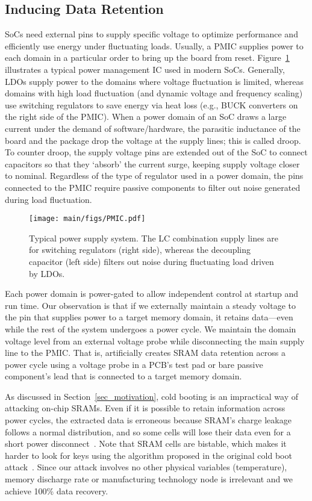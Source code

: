 \subsection{Inducing Data Retention}
\label{sec_attack_enabler}

SoCs need external pins to supply specific voltage to optimize performance and efficiently use energy under fluctuating loads.
Usually, a PMIC supplies power to each domain in a particular order to bring up the board from reset. 
Figure~\ref{fig:pmic} illustrates a typical power management IC used in modern SoCs. 
Generally, LDOs supply power to the domains where voltage fluctuation is limited, whereas domains with high load fluctuation (and dynamic voltage and frequency scaling) use switching regulators to save energy via heat loss (e.g., BUCK converters on the right side of the PMIC). 
When a power domain of an SoC draws a large current under the demand of software/hardware, the parasitic inductance of the board and the package drop the voltage at the supply lines;
this is called droop.
To counter droop, the supply voltage pins are extended out of the SoC to connect capacitors so that they `absorb' the current surge, keeping supply voltage closer to nominal. 
Regardless of the type of regulator used in a power domain, the pins connected to the PMIC require passive components to filter out noise generated during load fluctuation.

\begin{figure}
    \centering
    \texttt{[image: main/figs/PMIC.pdf]}
    \caption{Typical power supply system.  The LC combination supply lines are for switching regulators (right side), whereas the decoupling capacitor (left side) filters out noise during fluctuating load driven by LDOs.}
    \label{fig:pmic}
\end{figure}

Each power domain is power-gated to allow independent control at startup and run time. 
Our observation is that if we externally maintain a steady voltage to the pin that supplies power to a target memory domain, it retains data---even while the rest of the system undergoes a power cycle.  
We maintain the domain voltage level from an external voltage probe while disconnecting the main supply line to the PMIC. 
That is, \sys{} artificially creates SRAM data retention across a power cycle using a voltage probe in a PCB's test pad or bare passive component's lead that is connected to a target memory domain. 

As discussed in Section~\ref{sec_motivation}, cold booting is an impractical way of attacking on-chip SRAMs.   
Even if it is possible to retain information across power cycles, the extracted data is erroneous because SRAM's charge leakage follows a normal distribution, and so some cells will lose their data even for a short power disconnect~\cite{qin2004sram}. Note that SRAM cells are bistable, which makes it harder to look for keys using the algorithm proposed in the original cold boot attack~\cite{halderman2009lest}.  
Since our attack involves no other physical variables (\eg temperature), memory discharge rate or manufacturing technology node is irrelevant and we achieve 100\% data recovery. 


